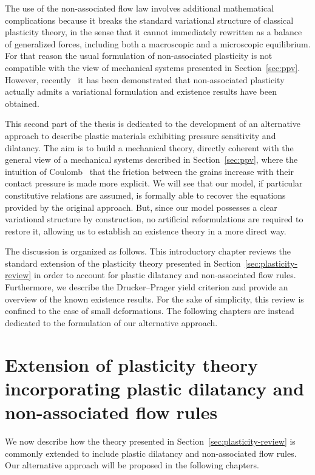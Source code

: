 \documentclass[a4paper,10pt,twoside]{amsbook}
\numberwithin{section}{chapter}
\numberwithin{equation}{chapter}
\theoremstyle{definition}
\begin{document}
The use of the non-associated flow law involves additional mathematical complications because it breaks the standard variational structure of classical plasticity theory, in the sense that it cannot immediately rewritten as a balance of generalized forces, including both a macroscopic and a microscopic equilibrium. For that reason the usual formulation of non-associated plasticity is not compatible with the view of mechanical systems presented in Section~\ref{sec:ppv}. However, recently~\cite{morafrancfort,StefanelliVikelis2024} it has been demonstrated that non-associated plasticity actually admits a variational formulation and existence results have been obtained.

This second part of the thesis is dedicated to the development of an alternative approach to describe plastic materials exhibiting pressure sensitivity and dilatancy. The aim is to build a mechanical theory, directly coherent with the general view of a mechanical systems described in Section~\ref{sec:ppv}, where the intuition of Coulomb~\cite{Coulomb1776} that the friction between the grains increase with their contact pressure is made more explicit. We will see that our model, if particular constitutive relations are assumed, is formally able to recover the equations provided by the original approach. But, since our model possesses a clear variational structure by construction, no artificial reformulations are required to restore it, allowing us to establish an existence theory in a more direct way.

The discussion is organized as follows. This introductory chapter reviews the standard extension of the plasticity theory presented in Section~\ref{sec:plasticity-review} in order to account for plastic dilatancy and non-associated flow rules. Furthermore, we describe the Drucker--Prager yield criterion and provide an overview of the known existence results. For the sake of simplicity, this review is confined to the case of small deformations. The following chapters are instead dedicated to the formulation of our alternative approach.

\section{Extension of plasticity theory incorporating plastic dilatancy and non-associated flow rules}
\label{sec:plasticity-review-soil}

We now describe how the theory presented in Section~\ref{sec:plasticity-review} is commonly extended to include plastic dilatancy and non-associated flow rules. Our alternative approach will be proposed in the following chapters.
\end{document}
